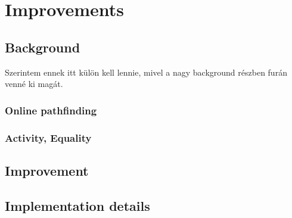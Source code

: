 \chapter{Improvements}

\section{Background}

Szerintem ennek itt külön kell lennie, mivel a nagy background részben furán venné ki magát.

\subsection{Online pathfinding}
\subsection{Activity, Equality}

\section{Improvement}


\section{Implementation details}

